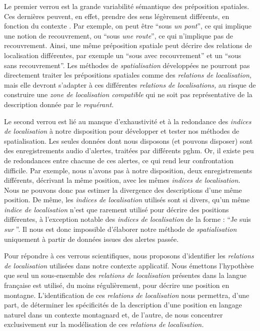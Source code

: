 Le premier verrou est la grande variabilité sémantique des préposition
spatiales. Ces dernières peuvent, en effet, prendre des sens
légèrement différents, en fonction du contexte
\autocite{Bateman2010}. Par exemple, on peut être \enquote{sous
  \emph{un pont}}, ce qui implique une notion de recouvrement, ou
\enquote{sous \emph{une route}}, ce qui n'implique pas de
recouvrement. Ainsi, une même préposition spatiale peut décrire des
relations de localisation différentes, par exemple un \enquote{sous
  avec recouvrement} et un \enquote{sous sans recouvrement}. Les
méthodes de \emph{spatialisation} développées ne pourront pas
directement traiter les prépositions spatiales comme des
\emph{relations de localisation,} mais elle devront s'adapter à ces
différentes \emph{relations de localisations,} au risque de construire
une \emph{zone de localisation compatible} qui ne soit pas
représentative de la description donnée par le \emph{requérant.}

Le second verrou est lié au manque d’exhaustivité et à la redondance
des \emph{indices de localisation} à notre disposition pour développer
et tester nos méthodes de spatialisation. Les seules données dont nous
disposons (et pouvons disposer) sont des enregistrements audio
d'alertes, traitées par différents \ac{pghm}. Or, il existe peu de
redondances entre chacune de ces alertes, ce qui rend leur
confrontation difficile. Par exemple, nous n'avons pas à notre
disposition, deux enregistrements différents, décrivant la même
position, avec les mêmes \emph{indices de localisation.} Nous ne
pouvons donc pas estimer la divergence des descriptions d'une même
position. De même, les \emph{indices de localisation} utilisés sont si
divers, qu'un même \emph{indice de localisation} n'est que rarement
utilisé pour décrire des positions différentes, à l'exception notable
des \emph{indices de localisation} de la forme : \enquote{Je suis
  \emph{sur} }. Il
nous est donc impossible d’élaborer notre méthode de
\emph{spatialisation} uniquement à partir de données issues des
alertes passée.

Pour répondre à ces verrous scientifiques, nous proposons d'identifier
les \emph{relations de localisation} utilisées dans notre contexte
applicatif. Nous émettons l'hypothèse que seul un sous-ensemble des
\emph{relations de localisation} présentes dans la langue française
est utilisé, du moins régulièrement, pour décrire une position en
montagne. L'identification de ces \emph{relations de localisation}
nous permettra, d'une part, de déterminer les spécificités de la
description d'une position en langage naturel dans un contexte
montagnard et, de l'autre, de nous concentrer exclusivement sur la
modélisation de ces \emph{relations de localisation.}

